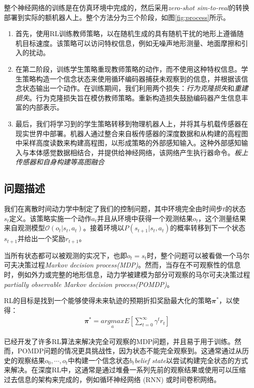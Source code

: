   整个神经网络的训练是在仿真环境中完成的，然后采用\emph{zero-shot sim-to-real}的转换部署到实际的额机器人上。整个方法分为三个阶段，如图\ref{fig:process}所示。
  \begin{enumerate}
    \item 首先，使用RL训练教师策略，以在随机生成的具有随机干扰的地形上遵循随机目标速度。该策略可以访问特权信息，例如无噪声地形测量、地面摩擦和引入的扰动。
    \item 在第二阶段，训练学生策略重现教师策略的动作，而不使用这种特权信息。学生策略构造一个信念状态来使用循环编码器捕获未观察到的信息，并根据该信念状态输出一个动作。在训练期间，我们利用两个损失：\emph{行为克隆损失}和\emph{重建损失}。行为克隆损失旨在模仿教师策略。重新构造损失鼓励编码器产生信息丰富的内部表示。
    \item 最后，我们将学习到的学生策略转移到物理机器人上，并将其与机载传感器在现实世界中部署。机器人通过整合来自板传感器的深度数据和从构建的高程图中采样高度读数来构建高程图，以形成策略的外部感知输入。这种外部感知输入与本体感觉数据相结合，并提供给神经网络，该网络产生执行器命令。\emph{板上传感器和自身构建等高图融合}
  \end{enumerate}
  
  \subsection[问题描述]{问题描述}
  
  我们在离散时间动力学中制定了我们的控制问题，其中环境完全由时间步$t$的状态$s_t$定义。该策略实施一个动作$a_t$并且从环境中获得一个观测结果$o_t$，这个测量结果来自观测模型$\mathcal{O}(o_t|s_t,a_t)$。接着环境以$P(s_{t+1}|s_t, a_t)$的概率转移到下一个状态$s_{t+1}$并给出一个奖励$r_{t+1}$。
  
  当所有状态都可以被观测的实况下，也即$o_t=s_t$时，整个问题可以被看做一个马尔可夫决策过程\emph{Markov decision process(MDP)}。然而，当存在不可观察性的信息时，例如外力或完整的地形信息，动力学被建模为部分可观察的马尔可夫决策过程\emph{partially observable Markov decision process(POMDP)}。
  
  RL的目标是找到一个能够使得未来轨迹的预期折扣奖励最大化的策略$\mathbfit{\pi}^*$，以使得：
  \begin{align}
    \mathbfit{\pi}^*=\underset{a}{argmax}E[\sum_{t=0}^{\infty}\gamma^t r_t]
  \end{align}
  
  已经开发了许多RL算法来解决完全可观察的MDP问题，并且易于用于训练。然而，POMDP问题的情况更具挑战性，因为状态不能完全观察到。这通常通过从历史的观察结果$o_0, \cdots, o_t$中构建一个信念状态$b_t$\emph{belief state}以尝试构建完全状态的方式来解决。在深度RL中，这通常是通过堆叠一系列先前的观察结果\cite[p]{Mnih_Kavukcuoglu_Silver_Graves_Antonoglou_Wierstra_Riedmiller_2013}或使用可以压缩过去信息的架构来完成的，例如循环神经网络 (RNN) \cite[p]{Zhu_Li_Poupart_Miao_2017}或时间卷积网络\cite[p]{Lee_Hwangbo_Wellhausen_Koltun_Hutter_2020,Bai_Kolter_Koltun_2018}。
  
